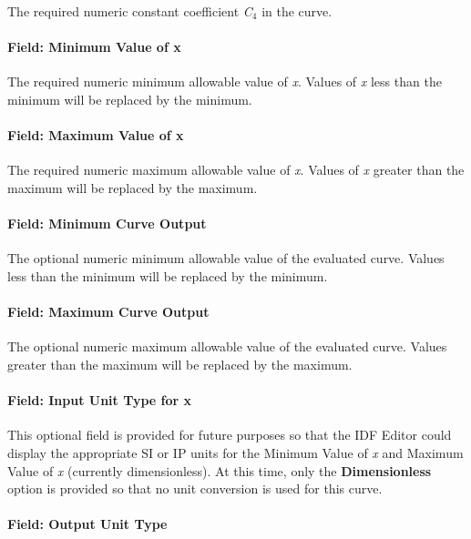 The required numeric constant coefficient \emph{C\(_{4}\)} in the curve.

\paragraph{Field: Minimum Value of x}\label{field-minimum-value-of-x-12}

The required numeric minimum allowable value of \emph{x}. Values of \emph{x} less than the minimum will be replaced by the minimum.

\paragraph{Field: Maximum Value of x}\label{field-maximum-value-of-x-13}

The required numeric maximum allowable value of \emph{x}. Values of \emph{x} greater than the maximum will be replaced by the maximum.

\paragraph{Field: Minimum Curve Output}\label{field-minimum-curve-output-12}

The optional numeric minimum allowable value of the evaluated curve. Values less than the minimum will be replaced by the minimum.

\paragraph{Field: Maximum Curve Output}\label{field-maximum-curve-output-11}

The optional numeric maximum allowable value of the evaluated curve. Values greater than the maximum will be replaced by the maximum.

\paragraph{Field: Input Unit Type for x}\label{field-input-unit-type-for-x-12}

This optional field is provided for future purposes so that the IDF Editor could display the appropriate SI or IP units for the Minimum Value of \emph{x} and Maximum Value of \emph{x} (currently dimensionless). At this time, only the \textbf{Dimensionless} option is provided so that no unit conversion is used for this curve.

\paragraph{Field: Output Unit Type}\label{field-output-unit-type-11}

